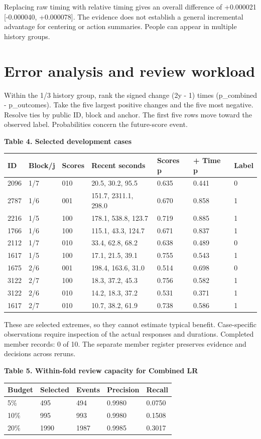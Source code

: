 \documentclass[10pt]{article}
\begin{document}
Replacing raw timing with relative timing gives an overall difference of +0.000021 [-0.000040, +0.000078]. The evidence does not establish a general incremental advantage for centering or action summaries. People can appear in multiple history groups.

\clearpage
\section*{Error analysis and review workload}
Within the 1/3 history group, rank the signed change (2y - 1) times (p\_combined - p\_outcomes). Take the five largest positive changes and the five most negative. Resolve ties by public ID, block and anchor. The first five rows move toward the observed label. Probabilities concern the future-score event.

\noindent\textbf{Table 4. Selected development cases}\par
\begin{tabular}{lllllll}
\toprule
ID & Block/j & Scores & Recent seconds & Scores p & + Time p & Label \\
\midrule
2096 & 1/7 & 010 & 20.5, 30.2, 95.5 & 0.635 & 0.441 & 0 \\
2787 & 1/6 & 001 & 151.7, 2311.1, 298.0 & 0.670 & 0.858 & 1 \\
2216 & 1/5 & 100 & 178.1, 538.8, 123.7 & 0.719 & 0.885 & 1 \\
1766 & 1/6 & 100 & 115.1, 43.3, 124.7 & 0.671 & 0.837 & 1 \\
2112 & 1/7 & 010 & 33.4, 62.8, 68.2 & 0.638 & 0.489 & 0 \\
1617 & 1/5 & 100 & 17.1, 21.5, 39.1 & 0.755 & 0.543 & 1 \\
1675 & 2/6 & 001 & 198.4, 163.6, 31.0 & 0.514 & 0.698 & 0 \\
3122 & 2/7 & 100 & 18.3, 37.2, 45.3 & 0.756 & 0.582 & 1 \\
3122 & 2/6 & 010 & 14.2, 18.3, 37.2 & 0.531 & 0.371 & 1 \\
1617 & 2/7 & 010 & 10.7, 38.2, 61.9 & 0.738 & 0.586 & 1 \\
\bottomrule
\end{tabular}

These are selected extremes, so they cannot estimate typical benefit. Case-specific observations require inspection of the actual responses and durations. Completed member records: 0 of 10. The separate member register preserves evidence and decisions across reruns.

\noindent\textbf{Table 5. Within-fold review capacity for Combined LR}\par
\begin{tabular}{lllll}
\toprule
Budget & Selected & Events & Precision & Recall \\
\midrule
5\% & 495 & 494 & 0.9980 & 0.0750 \\
10\% & 995 & 993 & 0.9980 & 0.1508 \\
20\% & 1990 & 1987 & 0.9985 & 0.3017 \\
\bottomrule
\end{tabular}
\end{document}
